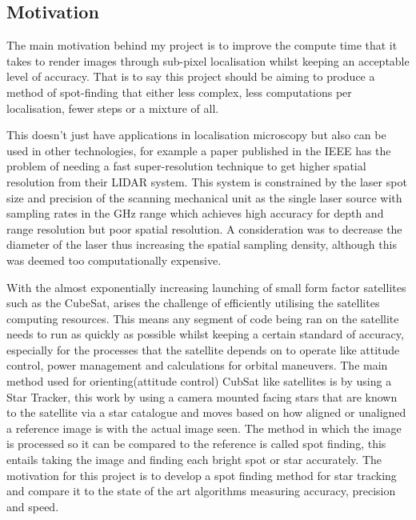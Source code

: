 \documentclass[aps,pra,a4paper,nofootinbib,onecolumn,tightenlines,longbibliography,12pt,amsfonts,amssymb,amsmath,floatfix]{revtex4-2} %
\begin{document}
  
  \subsection{Motivation} %
  \label{sub:Motivation}
  
  The main motivation behind my project is to improve the compute time that it
  takes to render images through sub-pixel localisation whilst keeping an
  acceptable level of accuracy. That is to say this project should be aiming to
  produce a method of spot-finding that either less complex, less computations
  per localisation, fewer steps or a mixture of all. 

  This doesn't just have applications in localisation microscopy but also 
  can be used in other technologies, for example a paper published in the IEEE
  has the problem of needing a fast super-resolution technique to get higher 
  spatial resolution from their LIDAR system. This system is constrained by the 
  laser spot size and precision of the scanning mechanical unit as the single laser 
  source with sampling rates in the GHz range which achieves high accuracy for depth 
  and range resolution but poor spatial resolution. A consideration was to decrease the 
  diameter of the laser thus increasing the spatial sampling density, although this 
  was deemed too computationally expensive.\cite{6638050}
  
  With the almost exponentially increasing launching of small form factor
  satellites such as the CubeSat, arises the challenge of efficiently utilising
  the satellites computing resources. This means any segment of code being ran on
  the satellite needs to run as quickly as possible whilst keeping a certain
  standard of accuracy, especially for the processes that the satellite depends
  on to operate like attitude control, power management and calculations for
  orbital maneuvers. The main method used for orienting(attitude control) CubSat
  like satellites is by using a Star Tracker, this work by using a camera mounted
  facing stars that are known to the satellite via a star catalogue and moves
  based on how aligned or unaligned a reference image is with the actual image
  seen.\cite{calitz2015design} The method in which the image is processed so it
  can be compared to the reference is called spot finding, this entails taking
  the image and finding each bright spot or star accurately. The motivation for
  this project is to develop a spot finding method for star tracking and compare
  it to the state of the art algorithms measuring accuracy, precision and speed.
\end{document}
